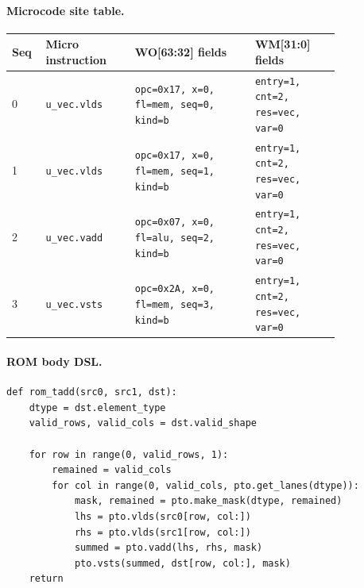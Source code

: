 \paragraph{Microcode site table.}
{\scriptsize
\begin{longtable}{@{}R{0.055\linewidth}L{0.23\linewidth}L{0.31\linewidth}L{0.22\linewidth}@{}}
\toprule
Seq & Micro instruction & WO[63:32] fields & WM[31:0] fields \\
 & \texttt{u\_vec.vlds} & \texttt{opc=0x17, x=0, fl=mem, seq=0, kind=b} & \texttt{entry=1, cnt=2, res=vec, var=0} \\
1 & \texttt{u\_vec.vlds} & \texttt{opc=0x17, x=0, fl=mem, seq=1, kind=b} & \texttt{entry=1, cnt=2, res=vec, var=0} \\
2 & \texttt{u\_vec.vadd} & \texttt{opc=0x07, x=0, fl=alu, seq=2, kind=b} & \texttt{entry=1, cnt=2, res=vec, var=0} \\
3 & \texttt{u\_vec.vsts} & \texttt{opc=0x2A, x=0, fl=mem, seq=3, kind=b} & \texttt{entry=1, cnt=2, res=vec, var=0} \\
\bottomrule
\end{longtable}
}
\paragraph{ROM body DSL.}
\begin{lstlisting}[style=ptocode]
def rom_tadd(src0, src1, dst):
    dtype = dst.element_type
    valid_rows, valid_cols = dst.valid_shape

    for row in range(0, valid_rows, 1):
        remained = valid_cols
        for col in range(0, valid_cols, pto.get_lanes(dtype)):
            mask, remained = pto.make_mask(dtype, remained)
            lhs = pto.vlds(src0[row, col:])
            rhs = pto.vlds(src1[row, col:])
            summed = pto.vadd(lhs, rhs, mask)
            pto.vsts(summed, dst[row, col:], mask)
    return
\end{lstlisting}
\Needspace{0.34\textheight}

